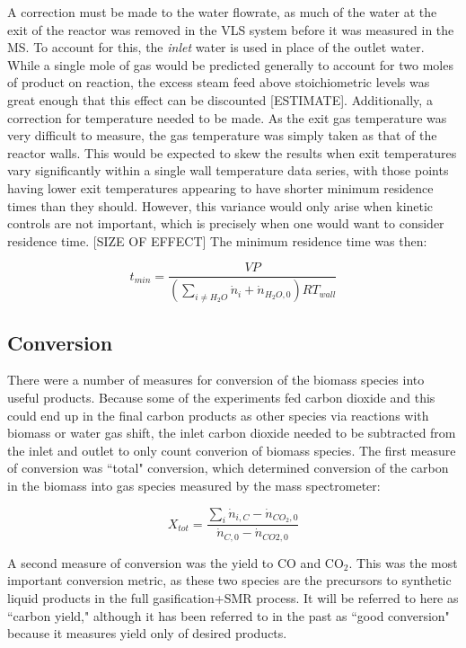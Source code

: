 \documentclass[11pt,twocolumn]{article}
\begin{document}
A correction must be made to the water flowrate, as much of the water at the exit of the reactor was removed in the VLS system before it was measured in the MS.  To account for this, the \emph{inlet} water is used in place of the outlet water.  While a single mole of gas would be predicted generally to account for two moles of product on reaction, the excess steam feed above stoichiometric levels was great enough that this effect can be discounted [ESTIMATE].  Additionally, a correction for temperature needed to be made.  As the exit gas temperature was very difficult to measure, the gas temperature was simply taken as that of the reactor walls.  This would be expected to skew the results when exit temperatures vary significantly within a single wall temperature data series, with those points having lower exit temperatures appearing to have shorter minimum residence times than they should.  However, this variance would only arise when kinetic controls are not important, which is precisely when one would want to consider residence time. [SIZE OF EFFECT]  The minimum residence time was then:

\begin{equation}
	t_{min} = \frac{VP}{(\sum_{i \ne H_{2}O}\dot{n}_{i}+\dot{n}_{H_{2}O,0})RT_{wall}}
\end{equation}

\subsection*{Conversion}
There were a number of measures for conversion of the biomass species into useful products.  Because some of the experiments fed carbon dioxide and this could end up in the final carbon products as other species via reactions with biomass or water gas shift, the inlet carbon dioxide needed to be subtracted from the inlet and outlet to only count converion of biomass species.  The first measure of conversion was ``total" conversion, which determined conversion of the carbon in the biomass into gas species measured by the mass spectrometer:

\begin{equation}
	X_{tot} = \frac{\sum_{i}\dot{n}_{i,C}-\dot{n}_{CO_{2},0}}{\dot{n}_{C,0}-\dot{n}_{CO{2},0}}
\end{equation}

A second measure of conversion was the yield to CO and CO$_2$.  This was the most important conversion metric, as these two species are the precursors to synthetic liquid products in the full gasification+SMR process.  It will be referred to here as ``carbon yield," although it has been referred to in the past as ``good conversion" because it measures yield only of desired products.
\end{document}
